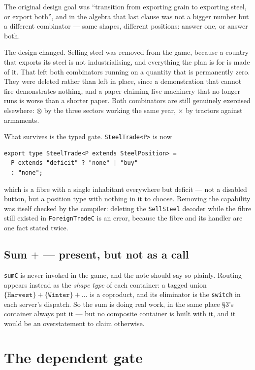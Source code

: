 \documentclass[11pt,a4paper]{article}
\begin{document}
\noindent The original design goal was ``transition from exporting grain to
exporting steel, or export both'', and in the algebra that last clause was not
a bigger number but a different combinator --- same shapes, different
positions: answer one, or answer both.

The design changed. Selling steel was removed from the game, because a country
that exports its steel is not industrialising, and everything the plan is for
is made of it. That left both combinators running on a quantity that is
permanently zero. They were deleted rather than left in place, since a
demonstration that cannot fire demonstrates nothing, and a paper claiming live
machinery that no longer runs is worse than a shorter paper. Both combinators
are still genuinely exercised elsewhere: $\otimes$ by the three sectors working
the same year, $\times$ by tractors against armaments.

What survives is the typed gate. \verb|SteelTrade<P>| is now

\begin{lstlisting}[language=TS]
export type SteelTrade<P extends SteelPosition> =
  P extends "deficit" ? "none" | "buy"
  : "none";
\end{lstlisting}

\noindent which is a fibre with a single inhabitant everywhere but deficit --- not
a disabled button, but a position type with nothing in it to choose. Removing
the capability was itself checked by the compiler: deleting the
\verb|SellSteel| decoder while the fibre still existed in \verb|ForeignTradeC|
is an error, because the fibre and its handler are one fact stated twice.

\subsection{Sum $+$ --- present, but not as a call}

\verb|sumC| is never invoked in the game, and the note should say so plainly.
Routing appears instead as the \emph{shape type} of each container: a tagged
union $\{\texttt{Harvest}\} + \{\texttt{Winter}\} + \dots$ is a coproduct, and
its eliminator is the \verb|switch| in each server's dispatch. So the sum is
doing real work, in the same place \S3's container always put it --- but no
composite container is built with it, and it would be an overstatement to
claim otherwise.

\section{The dependent gate}
\end{document}
